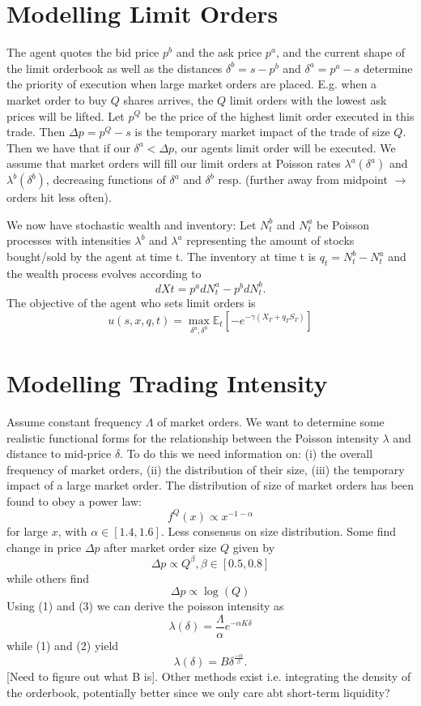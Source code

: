 \section{Modelling Limit Orders}
The agent quotes the bid price $p^b$ and the ask price $p^a$, and the current shape of the limit orderbook as well as the distances $\delta^b=s-p^b$ and $\delta^a=p^a-s$ determine the priority of execution when large market orders are placed. 
E.g. when a market order to buy $Q$ shares arrives, the $Q$ limit orders with the lowest ask prices will be lifted. 
Let $p^Q$ be the price of the highest limit order executed in this trade. Then $\Delta p=p^Q-s$ is the temporary market impact of the trade of size $Q.$ 
Then we have that if our $\delta^a < \Delta p$, our agents limit order will be executed. We assume that market orders will fill our limit orders at Poisson rates $\lambda^a(\delta^a)$ and $\lambda^b(\delta^b)$, decreasing functions of $\delta^a$ and $\delta^b$ resp. 
(further away from midpoint $\rightarrow$ orders hit less often).

We now have stochastic wealth and inventory: Let $N^b_t$ and $N^a_t$ be Poisson processes with intensities $\lambda^b$ and $\lambda^a$ representing the amount of stocks bought/sold by the agent at time t. The inventory at time t is $q_t=N^b_t-N^a_t$ and the wealth process evolves according to
$$dXt=p^adN^a_t-p^bdN^b_t.$$
The objective of the agent who sets limit orders is 
$$u(s,x,q,t)=\max\limits_{\delta^a,\delta^b}\mathbb{E}_t\left[-e^{-\gamma(X_T+q_TS_T)}\right]$$

\section{Modelling Trading Intensity}
Assume constant frequency $\Lambda$ of market orders. We want to determine some realistic functional forms for the relationship between the Poisson intensity $\lambda$ and distance to mid-price $\delta$. 
To do this we need information on: (i) the overall frequency of market orders, (ii) the distribution of their size, (iii) the temporary impact of a large market order. The distribution of size of market orders has been found to obey a power law:
\begin{equation}
    f^{Q}(x)\propto x^{-1-\alpha}
\end{equation}
for large $x$, with $\alpha\in[1.4,1.6].$
Less consensus on size distribution. Some find change in price $\Delta p$ after market order size $Q$ given by 
\begin{equation}
    \Delta p\propto Q^\beta, \beta\in[0.5,0.8]
\end{equation}
while others find
\begin{equation}
    \Delta p\propto\log(Q)
\end{equation}
Using (1) and (3) we can derive the poisson intensity as
$$\lambda(\delta)=\frac{\Lambda}{\alpha}e^{-\alpha K\delta}$$
while (1) and (2) yield
$$\lambda(\delta)=B\delta^{\frac{-\alpha}{\beta}}.$$
[Need to figure out what B is]. Other methods exist i.e. integrating the density of the orderbook, potentially better since we only care abt short-term liquidity?

